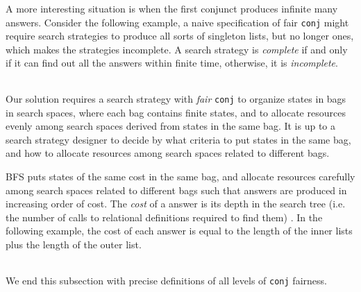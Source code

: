\documentclass[format=acmlarge, review=true, authordraft=true]{acmart}
\newcommand{\conj}{\texttt{conj}}
\begin{document}
\begin{center}
	\begin{tabular}{c}
		
	\end{tabular}
\end{center}

A more interesting situation is when the first conjunct produces infinite many 
answers. Consider the following example, a naive specification of fair \conj{} 
might require search strategies to produce all sorts of singleton lists, but no 
longer ones, which makes the strategies incomplete. A search strategy is 
\emph{complete} if and only if it can find out all the answers within finite 
time, otherwise, it is \emph{incomplete}.

\begin{center}
	\begin{tabular}{c}
		
	\end{tabular}
\end{center}

Our solution requires a search strategy with \emph{fair} \conj{} to organize
states in bags in search spaces, where each bag contains finite states, and 
to allocate resources evenly among search spaces derived from states in the 
same bag. It is up to a search strategy designer to decide by what criteria to 
put states in the same bag, and how to allocate resources among search spaces 
related to different bags.

BFS puts states of the same cost in the same bag, and allocate resources 
carefully among search spaces related to different bags such that answers are 
produced in increasing order of cost. The \emph{cost} of a answer is its depth 
in the search tree (i.e. the number of calls to relational definitions required 
to find them) \citep{seres1999algebra}. In the following example, the cost of 
each answer is equal to the length of the inner lists plus the length of the 
outer list. 

\begin{center}
	\begin{tabular}{c}
		
	\end{tabular}
\end{center}

We end this subsection with precise definitions of all levels of \conj{} 
fairness. 

\end{document}
